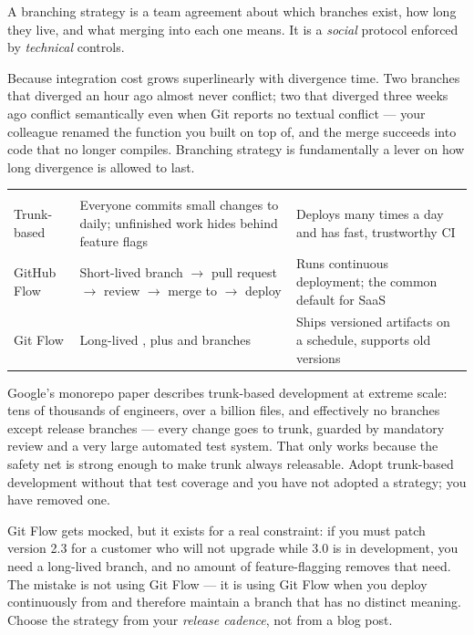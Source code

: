 
 A branching strategy is a team agreement about which branches exist, how long they live, and what merging into each one means. It is a \emph{social} protocol enforced by \emph{technical} controls.

 Because integration cost grows superlinearly with divergence time. Two branches that diverged an hour ago almost never conflict; two that diverged three weeks ago conflict semantically even when Git reports no textual conflict --- your colleague renamed the function you built on top of, and the merge succeeds into code that no longer compiles. Branching strategy is fundamentally a lever on how long divergence is allowed to last.

\begin{center}\small
\wbrowcolors
\begin{tabularx}{\linewidth}{@{}L{28mm} X L{40mm}@{}}
 &  & \\
Trunk-based & Everyone commits small changes to  daily; unfinished work hides behind feature flags & Deploys many times a day and has fast, trustworthy CI\\
GitHub Flow & Short-lived branch $\rightarrow$ pull request $\rightarrow$ review $\rightarrow$ merge to  $\rightarrow$ deploy & Runs continuous deployment; the common default for SaaS\\
Git Flow & Long-lived , plus  and  branches & Ships versioned artifacts on a schedule, supports old versions\\
\end{tabularx}
\end{center}

 Google's monorepo paper describes trunk-based development at extreme scale: tens of thousands of engineers, over a billion files, and effectively no branches except release branches --- every change goes to trunk, guarded by mandatory review and a very large automated test system. That only works because the safety net is strong enough to make trunk always releasable. Adopt trunk-based development without that test coverage and you have not adopted a strategy; you have removed one.

\begin{tradeoff}
Git Flow gets mocked, but it exists for a real constraint: if you must patch version 2.3 for a customer who will not upgrade while 3.0 is in development, you need a long-lived branch, and no amount of feature-flagging removes that need. The mistake is not using Git Flow --- it is using Git Flow when you deploy continuously from  and therefore maintain a  branch that has no distinct meaning. Choose the strategy from your \emph{release cadence}, not from a blog post.
\end{tradeoff}

